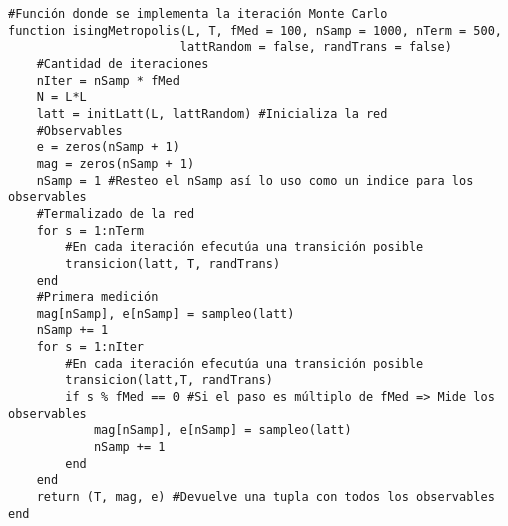 {\begin{lstlisting}[inputencoding=utf8,extendedchars=true]
#Función donde se implementa la iteración Monte Carlo
function isingMetropolis(L, T, fMed = 100, nSamp = 1000, nTerm = 500, 
                        lattRandom = false, randTrans = false) 
    #Cantidad de iteraciones
    nIter = nSamp * fMed  
    N = L*L   
    latt = initLatt(L, lattRandom) #Inicializa la red
    #Observables
    e = zeros(nSamp + 1)
    mag = zeros(nSamp + 1)
    nSamp = 1 #Resteo el nSamp así lo uso como un indice para los observables
    #Termalizado de la red
    for s = 1:nTerm
        #En cada iteración efecutúa una transición posible
        transicion(latt, T, randTrans)
    end
    #Primera medición
    mag[nSamp], e[nSamp] = sampleo(latt)
    nSamp += 1
    for s = 1:nIter
        #En cada iteración efecutúa una transición posible
        transicion(latt,T, randTrans)
        if s % fMed == 0 #Si el paso es múltiplo de fMed => Mide los observables
            mag[nSamp], e[nSamp] = sampleo(latt)
            nSamp += 1
        end
    end
    return (T, mag, e) #Devuelve una tupla con todos los observables
end
\end{lstlisting}
}





